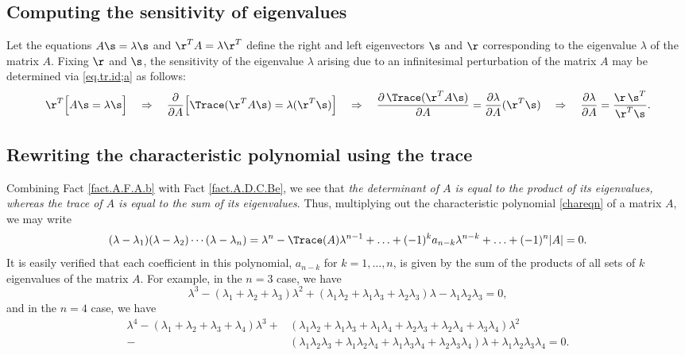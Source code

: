 \clearpage
\subsection{Computing the sensitivity of eigenvalues}\label{sec.eig.sensitivity}

Let the equations $A\s=\lambda \s$ and $\r^T A = \lambda \r^{T}$ define the right and left eigenvectors $\s$ and $\r$ corresponding to the eigenvalue $\lambda$ of the matrix $A$.
Fixing $\r$ and $\s$, the sensitivity of the eigenvalue $\lambda$ arising due to an infinitesimal perturbation of the matrix $A$ may be determined via \eqref{eq.tr.id;a} as follows:
\begin{equation*}
\r^T \Big[A\s = \lambda \s \Big] \quad \Rightarrow \quad
\frac{\partial}{\partial A} \Big[\Trace(\r^T A \s) = \lambda (\r^T \s)\Big] \quad \Rightarrow \quad
\frac{\partial\, \Trace(\r^T A \s)}{\partial A} = \frac{\partial \lambda}{\partial A} (\r^T \s)  \quad \Rightarrow \quad
\frac{\partial \lambda}{\partial A} = \frac{\r\,\s^T}{\r^T \s}.
\end{equation*}

\subsection{Rewriting the characteristic polynomial using the trace}

Combining Fact \ref{fact.A.F.A.b} with Fact \ref{fact.A.D.C.Be}, we see that
{\it the determinant of $A$ is equal to the product of its eigenvalues,
whereas the trace of $A$ is equal to the sum of its eigenvalues}.  Thus, multiplying out the characteristic polynomial \eqref{chareqn} of a matrix $A$, we may write
\begin{equation}
  (\lambda-\lambda_1) (\lambda-\lambda_2) \cdots (\lambda - \lambda_n) = \lambda^n - \Trace(A) \lambda^{n-1} + \ldots + (-1)^k a_{n-k} \lambda^{n-k} + \ldots + (-1)^n |A| = 0.
  \label{chareqnaaa}
\end{equation}
It is easily verified that each coefficient in this polynomial,  $a_{n-k}$ for $k=1,\ldots,n$, is given by the sum of the products of all sets of $k$ eigenvalues of the matrix $A$.  For example, in the $n=3$ case, we have
\begin{equation*}
  \lambda^3 - (\lambda_1+\lambda_2+\lambda_3) \lambda^{2} + (\lambda_1\lambda_2+\lambda_1\lambda_3+\lambda_2\lambda_3) \lambda  - \lambda_1\lambda_2\lambda_3 = 0,
\end{equation*}
and in the $n=4$ case, we have
\begin{align*}
  \lambda^4 - (\lambda_1+\lambda_2+\lambda_3+\lambda_4) \lambda^{3}
  + & (\lambda_1\lambda_2+\lambda_1\lambda_3+\lambda_1\lambda_4+\lambda_2\lambda_3+\lambda_2\lambda_4+\lambda_3\lambda_4) \lambda^2 \\
  - & (\lambda_1\lambda_2\lambda_3+\lambda_1\lambda_2\lambda_4+\lambda_1\lambda_3\lambda_4+\lambda_2\lambda_3\lambda_4) \lambda
  + \lambda_1\lambda_2\lambda_3\lambda_4 = 0.
\end{align*}

